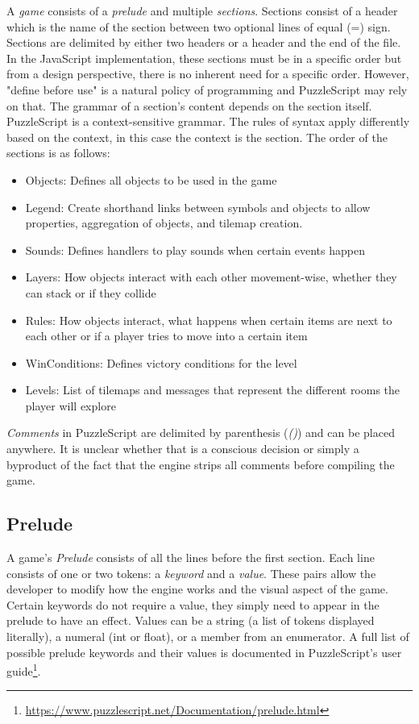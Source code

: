 A \emph{game} consists of a \emph{prelude} and multiple \emph{sections}. Sections consist of a header which is the name of the section between two optional lines of equal (=) sign. Sections are delimited by either two headers or a header and the end of the file. In the JavaScript implementation, these sections must be in a specific order but from a design perspective, there is no inherent need for a specific order. However, "define before use" is a natural policy of programming and PuzzleScript may rely on that. The grammar of a section's content depends on the section itself. PuzzleScript is a context-sensitive grammar. The rules of syntax apply differently based on the context, in this case the context is the section. The order of the sections is as follows:
\begin{itemize}
    \item Objects: Defines all objects to be used in the game
    \item Legend: Create shorthand links between symbols and objects to allow properties, aggregation of objects, and tilemap creation.
    \item Sounds: Defines handlers to play sounds when certain events happen
    \item Layers: How objects interact with each other movement-wise, whether they can stack or if they collide
    \item Rules: How objects interact, what happens when certain items are next to each other or if a player tries to move into a certain item
    \item WinConditions: Defines victory conditions for the level
    \item Levels: List of tilemaps and messages that represent the different rooms the player will explore
\end{itemize}

\emph{Comments} in PuzzleScript are delimited by parenthesis (\emph{()}) and can be placed anywhere. It is unclear whether that is a conscious decision or simply a byproduct of the fact that the engine strips all comments before compiling the game.

\subsection{Prelude}
A game's \emph{Prelude} consists of all the lines before the first section. Each line consists of one or two tokens: a \emph{keyword} and a \emph{value}. These pairs allow the developer to modify how the engine works and the visual aspect of the game. Certain keywords do not require a value, they simply need to appear in the prelude to have an effect. Values can be a string (a list of tokens displayed literally), a numeral (int or float), or a member from an enumerator. A full list of possible prelude keywords and their values is documented in PuzzleScript's user guide\footnote{\url{https://www.puzzlescript.net/Documentation/prelude.html}}. 

